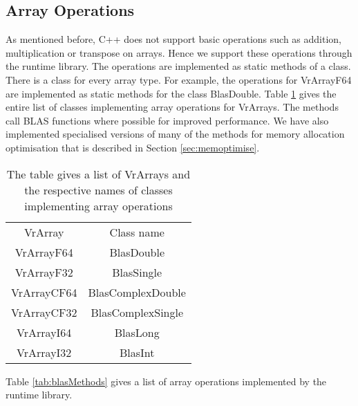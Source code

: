 \subsection{Array Operations}
\label{subsec:arrayOps}
As mentioned before, C++ does not support basic operations such as addition, multiplication or transpose on arrays. Hence we support these operations through the runtime library. The operations are implemented as static methods of a class. There is a class for every array type. For example, the operations for VrArrayF64 are implemented as static methods for the class BlasDouble. Table \ref{tab:vrArrayToBlasClass} gives the entire list of classes implementing array operations for VrArrays. The methods call BLAS functions where possible for improved performance. We have also implemented specialised versions of many of the methods for memory allocation optimisation that is described in Section \ref{sec:memoptimise}.
\begin{table}[h]
\centering
\begin{tabular}{|c|c|}
\hline
VrArray     & Class name        \\ \hhline{|=|=|}
VrArrayF64  & BlasDouble        \\ \hline
VrArrayF32  & BlasSingle        \\ \hline
VrArrayCF64 & BlasComplexDouble \\ \hline
VrArrayCF32 & BlasComplexSingle \\ \hline
VrArrayI64  & BlasLong          \\ \hline
VrArrayI32  & BlasInt           \\ \hline
\end{tabular}
\caption{The table gives a list of VrArrays and the respective names of classes implementing array operations}
\label{tab:vrArrayToBlasClass}
\end{table}
Table \ref{tab:blasMethods} gives a list of array operations implemented by the runtime library.
